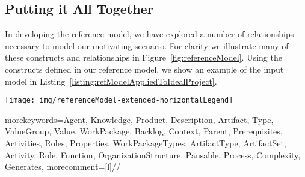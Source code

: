 \subsection{Putting it All Together}\label{sec:exampleRevisited}

In developing the reference model, we have explored a number of relationships
necessary to model our motivating scenario.  For clarity we illustrate many of
these constructs and relationships in Figure~\ref{fig:referenceModel}.  Using
the constructs defined in our reference model, we show an example of the input
model in Listing~\ref{listing:refModelAppliedToIdealProject}.


\begin{figure*}[htb]
    \centering
        \texttt{[image: img/referenceModel-extended-horizontalLegend]}
    \caption{The constructs and relationships in the reference model. 
        The \textit{work} construct above represents the objects required by
        the agent to complete some work---that is, perform an activity on a work
        package.}
    \label{fig:referenceModel}
\end{figure*}



{
    morekeywords={Agent, Knowledge, Product, Description, Artifact, Type,
        ValueGroup, Value, WorkPackage, Backlog, Context, Parent, Prerequisites,
        Activities, Roles, Properties, WorkPackageTypes, ArtifactType,
        ArtifactSet, Activity, Role, Function, OrganizationStructure,
        Pausable, Process, Complexity, Generates},
%
    morecomment=[l]{//}
}

